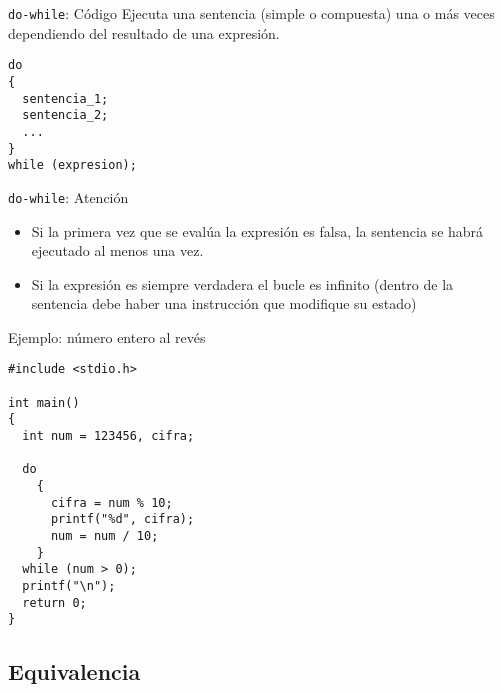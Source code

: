 \documentclass[xcolor={usenames,svgnames,dvipsnames}, aspectratio=169]{beamer}
\begin{document}
\begin{frame}[label={sec:orgda1f961},fragile]{\texttt{do-while}: Código}
 Ejecuta una sentencia (simple o compuesta) \alert{una o más veces} dependiendo del resultado de una expresión.
\lstset{language=C,label= ,caption= ,captionpos=b,numbers=none}
\begin{lstlisting}
do
{
  sentencia_1;
  sentencia_2;
  ...
}
while (expresion);
\end{lstlisting}
\end{frame}


\begin{frame}[label={sec:org7cb8e85},fragile]{\texttt{do-while}: Atención}
 \begin{block}{}
\begin{itemize}
\item Si la primera vez que se evalúa la expresión es falsa, la sentencia se habrá ejecutado al menos una vez.

\item Si la expresión es siempre verdadera \alert{el bucle es infinito} (dentro de la sentencia debe haber una instrucción que modifique su estado)
\end{itemize}
\end{block}
\end{frame}

\begin{frame}[label={sec:org4762788},fragile]{Ejemplo: número entero al revés}
 \lstset{language=C,label= ,caption= ,captionpos=b,numbers=none}
\begin{lstlisting}
#include <stdio.h>

int main()
{
  int num = 123456, cifra;

  do
    {
      cifra = num % 10;
      printf("%d", cifra);
      num = num / 10;
    }
  while (num > 0);
  printf("\n");
  return 0;
}
\end{lstlisting}
\end{frame}


\subsection{Equivalencia}
\label{sec:orgdcd6df0}
\end{document}
